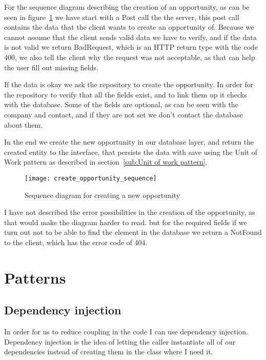 For the sequence diagram describing the creation of an opportunity, as can be
seen in figure~\ref{fig:opportunity_sequence} we have start with a Post call the
the server, this post call contains the data that the client wants to create an
opportunity of. Because we cannot assume that the client sends valid data we have
to verify, and if the data is not valid we return BadRequest, which is an HTTP
return type with the code 400, we also tell the client why the request was not
acceptable, as that can help the user fill out missing fields.

If the data is okay we ask the repository to create the opportunity. In order
for the repository to verify that all the fields exist, and to link them up it
checks with the database. Some of the fields are optional, as can be seen with
the company and contact, and if they are not set we don't contact the database
about them.

In the end we create the new opportunity in our database layer, and return the
created entity to the interface, that persists the data with save using the Unit
of Work pattern as described in section~\ref{sub:Unit of work pattern}.

\begin{figure}[!htb]
  \centering
  \texttt{[image: create\_opportunity\_sequence]}
  \caption{Sequence diagram for creating a new opportunity}
  \label{fig:opportunity_sequence}
\end{figure}

I have not described the error possibilities in the creation of the opportunity,
as that would make the diagram harder to read. but for the required fields if we
turn out not to be able to find the element in the database we return a NotFound
to the client, which has the error code of 404.

\section{Patterns}
\label{sec:Patterns}

\subsection{Dependency injection}
\label{sub:Dependency injection}
In order for us to reduce coupling in the code I can use dependency injection.
Dependency injection is the idea of letting the caller instantiate all of our
dependencies instead of creating them in the class where I need it. 

